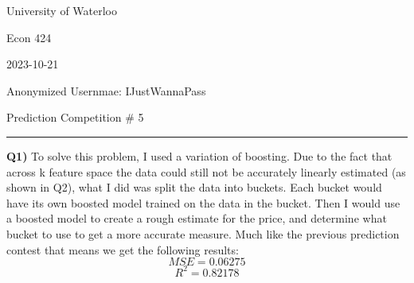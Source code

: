 \documentclass{article}
\begin{document}
\begin{titlepage}
	\setlength{\parindent}{0pt}
	\large

\vspace*{-2cm}

University of Waterloo \par
Econ 424 \par
2023-10-21 \par
\vspace{0.05cm}
Anonymized Usernmae: IJustWannaPass
\vspace{0.2cm}

{\huge Prediction Competition \# 5 \par}
\hrule

\vspace{1cm}
\textbf{Q1)} To solve this problem, I used a variation of boosting. Due to the fact that across k feature space the data could still not be accurately linearly estimated (as shown in Q2), what I did was split the data into buckets. Each bucket would have its own boosted model trained on the data in the bucket. Then I would use a boosted model to create a rough estimate for the price, and determine what bucket to use to get a more accurate measure. Much like the previous prediction contest that means we get the following results:
\[ MSE = 0.06275 \]
\[ R^2 = 0.82178 \]


\end{titlepage}
\end{document}

